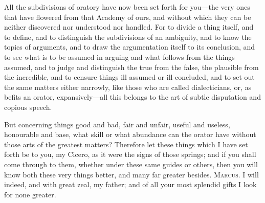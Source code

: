  All the subdivisions of oratory have now been set forth for you—the very ones that have flowered from that Academy of ours, and without which they can be neither discovered nor understood nor handled. For to divide a thing itself, and to define, and to distinguish the subdivisions of an ambiguity, and to know the topics of arguments, and to draw the argumentation itself to its conclusion, and to see what is to be assumed in arguing and what follows from the things assumed, and to judge and distinguish the true from the false, the plausible from the incredible, and to censure things ill assumed or ill concluded, and to set out the same matters either narrowly, like those who are called dialecticians, or, as befits an orator, expansively—all this belongs to the art of subtle disputation and copious speech.

 But concerning things good and bad, fair and unfair, useful and useless, honourable and base, what skill or what abundance can the orator have without those arts of the greatest matters? Therefore let these things which I have set forth be to you, my Cicero, as it were the signs of those springs; and if you shall come through to them, whether under these same guides or others, then you will know both these very things better, and many far greater besides. \textsc{Marcus.} I will indeed, and with great zeal, my father; and of all your most splendid gifts I look for none greater.
